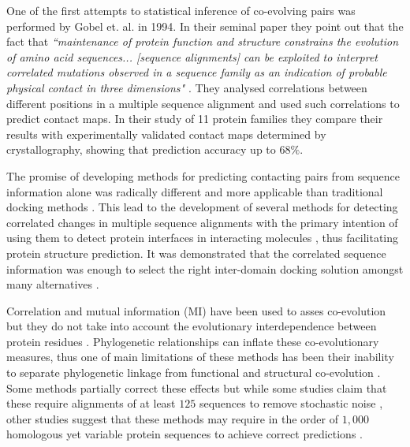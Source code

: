 One of the first attempts to statistical inference of co-evolving pairs was performed by Gobel et. al. in 1994.
In their seminal paper they point out that the fact that \textit{``maintenance of protein function and structure constrains the evolution of amino acid sequences... [sequence alignments] can be exploited to interpret correlated mutations observed in a sequence family as an indication of probable physical contact in three dimensions"} \cite{gobel1994correlated}. 
They  analysed correlations between different positions in a multiple sequence alignment and used such correlations to predict contact maps.
In their study of 11 protein families they compare their results with experimentally validated contact maps determined by crystallography, showing that prediction accuracy up to $68\%$.

The promise of developing methods for predicting contacting pairs from sequence information alone was radically different and more applicable than traditional docking methods \cite{pazos1997correlated}.
This lead to the development of several methods for detecting correlated changes in multiple sequence alignments with the primary intention of using them to detect protein interfaces in interacting molecules \cite{pazos1997correlated}, thus facilitating protein structure prediction.
It was demonstrated that the correlated sequence information was enough to select the right inter-domain docking solution amongst many alternatives  \cite{pazos1997correlated}.

Correlation and mutual information (MI) have been used to asses co-evolution but they do not take into account the evolutionary interdependence between protein residues \cite{fares2006novel}.
Phylogenetic relationships can inflate these co-evolutionary measures, thus one of main limitations of these methods has been their inability to separate phylogenetic linkage from functional and structural co-evolution \cite{fares2006novel}.
Some methods partially correct these effects but while some studies claim that these require alignments of at least $125$ sequences to remove stochastic noise \cite{fares2006novel:REF Gloor et al. (2005)}, other studies suggest that these methods may require in the order of $1,000$ homologous yet variable protein sequences to achieve correct predictions \cite{morcos2011direct}.

